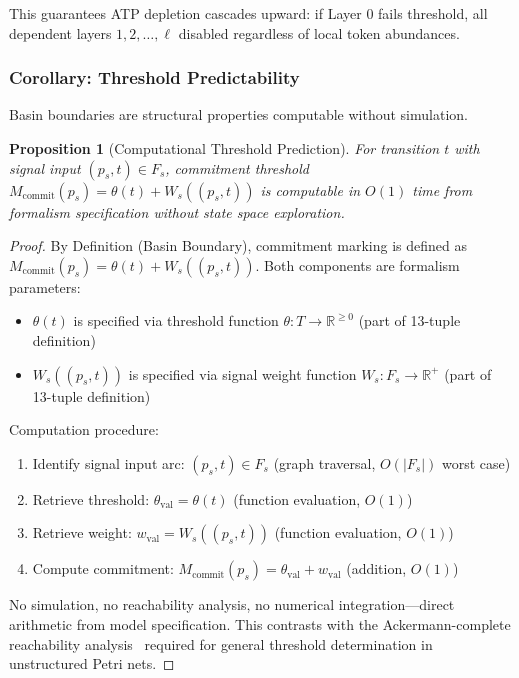 \documentclass[10pt,letterpaper]{article}
\newtheorem{proposition}{Proposition}
\begin{document}
This guarantees ATP depletion cascades upward: if Layer 0 fails threshold, all dependent layers $1, 2, \ldots, \ell$ disabled regardless of local token abundances.

\subsubsection{Corollary: Threshold Predictability}

Basin boundaries are structural properties computable without simulation.

\begin{proposition}[Computational Threshold Prediction]
For transition $t$ with signal input $(p_s,t) \in F_s$, commitment threshold $M_{\text{commit}}(p_s) = \theta(t) + W_s((p_s,t))$ is computable in $O(1)$ time from formalism specification without state space exploration.
\end{proposition}

\begin{proof}
By Definition (Basin Boundary), commitment marking is defined as $M_{\text{commit}}(p_s) = \theta(t) + W_s((p_s,t))$. Both components are formalism parameters:
\begin{itemize}
\item $\theta(t)$ is specified via threshold function $\theta: T \rightarrow \mathbb{R}^{\geq 0}$ (part of 13-tuple definition)
\item $W_s((p_s,t))$ is specified via signal weight function $W_s: F_s \rightarrow \mathbb{R}^+$ (part of 13-tuple definition)
\end{itemize}

Computation procedure:
\begin{enumerate}
\item Identify signal input arc: $(p_s,t) \in F_s$ (graph traversal, $O(|F_s|)$ worst case)
\item Retrieve threshold: $\theta_{\text{val}} = \theta(t)$ (function evaluation, $O(1)$)
\item Retrieve weight: $w_{\text{val}} = W_s((p_s,t))$ (function evaluation, $O(1)$)
\item Compute commitment: $M_{\text{commit}}(p_s) = \theta_{\text{val}} + w_{\text{val}}$ (addition, $O(1)$)
\end{enumerate}

No simulation, no reachability analysis, no numerical integration---direct arithmetic from model specification. This contrasts with the Ackermann-complete reachability analysis~\cite{czerwinski2021} required for general threshold determination in unstructured Petri nets.
\end{proof}
\end{document}
